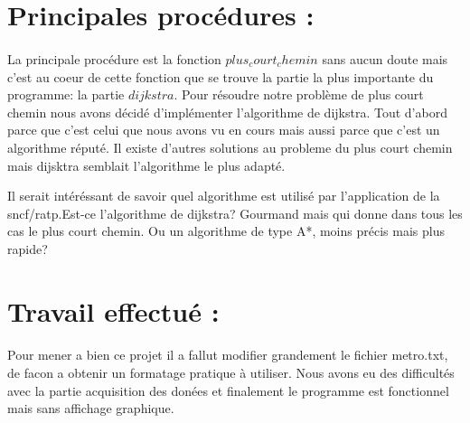 \documentclass[a4paper]{article}
\begin{document}
\section{Principales procédures :}
  \paragraph{}
  La principale procédure est la fonction $plus_court_chemin$ sans aucun doute mais c'est au coeur de cette fonction que se trouve la partie la plus importante du programme: la partie $dijkstra$.
  Pour résoudre notre problème de plus court chemin nous avons décidé d'implémenter l'algorithme de dijkstra. Tout d'abord parce que c'est celui que nous avons vu en cours mais aussi parce que c'est un algorithme réputé.
  Il existe d'autres solutions au probleme du plus court chemin mais dijsktra semblait l'algorithme le plus adapté.

  Il serait intéréssant de savoir quel algorithme est utilisé par l'application de la sncf/ratp.Est-ce l'algorithme de dijkstra? Gourmand mais qui donne dans tous les cas le plus court chemin. Ou un algorithme de type A*, moins précis mais plus rapide?
\section{Travail effectué :}
  \paragraph{}
  Pour mener a bien ce projet il a fallut modifier grandement le fichier metro.txt, de facon a obtenir un formatage pratique à utiliser.
  Nous avons eu des difficultés avec la partie acquisition des donées et finalement le programme est fonctionnel mais sans affichage graphique.
\newpage
{}
\end{document}
